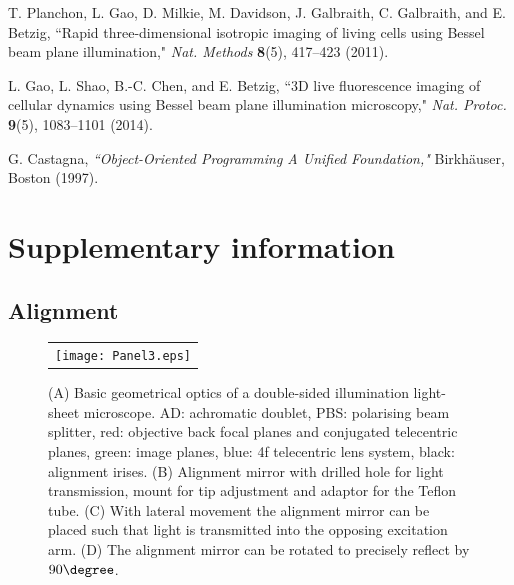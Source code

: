 \documentclass[12pt]{spieman}  %
\begin{document}
\begin{spacing}{2}
\begin{thebibliography}{0}
 T. Planchon, L. Gao, D. Milkie, M. Davidson, J. Galbraith, C. Galbraith, and E. Betzig, ``Rapid three-dimensional isotropic imaging of living cells using Bessel beam plane illumination," \emph{Nat. Methods} \textbf{8}(5), 417–423 (2011).

 L. Gao, L. Shao, B.-C. Chen, and E. Betzig, ``3D live fluorescence imaging of cellular dynamics using Bessel beam plane illumination microscopy," \emph{Nat. Protoc.} \textbf{9}(5), 1083–1101 (2014).

 G. Castagna, \emph{``Object-Oriented Programming A Unified Foundation,"} Birkh{\"a}user, Boston (1997).

\end{thebibliography}

\pagebreak
\section{Supplementary information}

\subsection{Alignment}

\begin{figure}
   \begin{center}
   \begin{tabular}{c}
   \texttt{[image: Panel3.eps]}
   \end{tabular}
   \end{center}
   \caption{\label{fig:alignment} (A) Basic geometrical optics of a double-sided illumination light-sheet microscope. AD: achromatic doublet, PBS: polarising beam splitter, red: objective back focal planes and conjugated telecentric planes, green: image planes, blue: 4f telecentric lens system, black: alignment irises. (B) Alignment mirror with drilled hole for light transmission, mount for tip adjustment and adaptor for the Teflon tube. (C) With lateral movement the alignment mirror can be placed such that light is transmitted into the opposing excitation arm. (D) The alignment mirror can be rotated to precisely reflect by $90\degree$.} 
   \end{figure}


\end{spacing}
\end{document}
